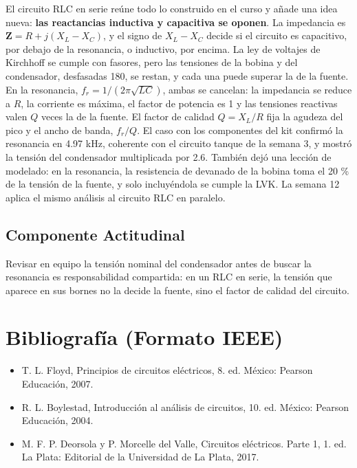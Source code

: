 \documentclass[11pt,letterpaper]{article}
\begin{document}
El circuito RLC en serie reúne todo lo construido en el curso y añade una idea nueva: \textbf{las reactancias inductiva y capacitiva se oponen}. La impedancia es $\mathbf{Z} = R + j(X_L - X_C)$, y el signo de $X_L - X_C$ decide si el circuito es capacitivo, por debajo de la resonancia, o inductivo, por encima. La ley de voltajes de Kirchhoff se cumple con fasores, pero las tensiones de la bobina y del condensador, desfasadas 180\textdegree{}, se restan, y cada una puede superar la de la fuente. En la resonancia, $f_r = 1/(2\pi\sqrt{LC})$, ambas se cancelan: la impedancia se reduce a $R$, la corriente es máxima, el factor de potencia es 1 y las tensiones reactivas valen $Q$ veces la de la fuente. El factor de calidad $Q = X_L/R$ fija la agudeza del pico y el ancho de banda, $f_r/Q$. El caso con los componentes del kit confirmó la resonancia en 4.97 kHz, coherente con el circuito tanque de la semana 3, y mostró la tensión del condensador multiplicada por 2.6. También dejó una lección de modelado: en la resonancia, la resistencia de devanado de la bobina toma el 20 \% de la tensión de la fuente, y solo incluyéndola se cumple la LVK. La semana 12 aplica el mismo análisis al circuito RLC en paralelo.

\subsection*{Componente Actitudinal}

\begin{cita}
Revisar en equipo la tensión nominal del condensador antes de buscar la resonancia es responsabilidad compartida: en un RLC en serie, la tensión que aparece en sus bornes no la decide la fuente, sino el factor de calidad del circuito.
\end{cita}

\section{Bibliografía (Formato IEEE)}

{\sloppy
\begin{itemize}[leftmargin=2.6em, labelwidth=2.2em, labelsep=0.4em, align=left]
  \item[{[1]}] T. L. Floyd, Principios de circuitos eléctricos, 8.\textordfeminine{} ed. México: Pearson Educación, 2007.
  \item[{[2]}] R. L. Boylestad, Introducción al análisis de circuitos, 10.\textordfeminine{} ed. México: Pearson Educación, 2004.
  \item[{[3]}] M. F. P. Deorsola y P. Morcelle del Valle, Circuitos eléctricos. Parte 1, 1.\textordfeminine{} ed. La Plata: Editorial de la Universidad de La Plata, 2017.
\end{itemize}
}
\end{document}
